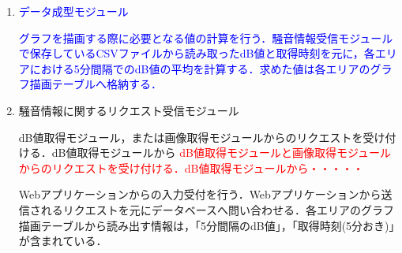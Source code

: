 \begin{enumerate}
\item \textcolor{blue}{データ成型モジュール}

\textcolor{blue}{グラフを描画する際に必要となる値の計算を行う．騒音情報受信モジュールで保存しているCSVファイルから読み取ったdB値と取得時刻を元に，各エリアにおける5分間隔でのdB値の平均を計算する．求めた値は各エリアのグラフ描画テーブルへ格納する．}

\item 騒音情報に関するリクエスト受信モジュール

dB値取得モジュール，または画像取得モジュールからのリクエストを受け付ける．dB値取得モジュールから
\textcolor{red}{dB値取得モジュールと画像取得モジュールからのリクエストを受け付ける．dB値取得モジュールから・・・・・}

Webアプリケーションからの入力受付を行う．Webアプリケーションから送信されるリクエストを元にデータベースへ問い合わせる．各エリアのグラフ描画テーブルから読み出す情報は，「5分間隔のdB値」，「取得時刻(5分おき)」が含まれている．
\end{enumerate}


